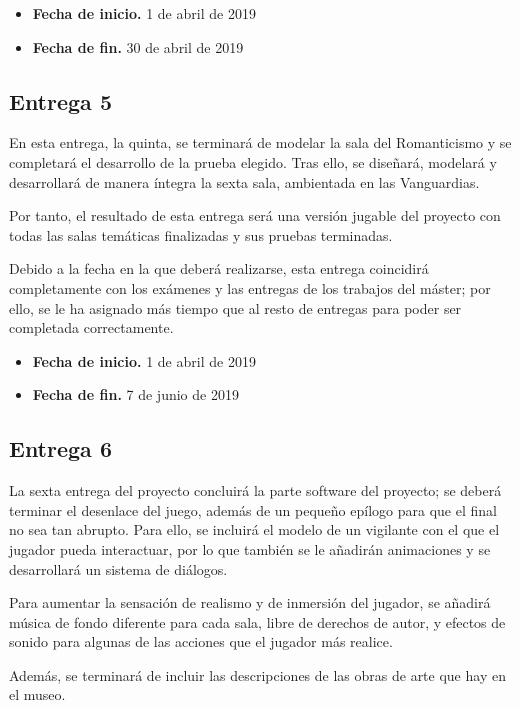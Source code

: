 \begin{itemize}
    \item \textbf{Fecha de inicio.} 1 de abril de 2019
    \item \textbf{Fecha de fin.} 30 de abril de 2019
\end{itemize}

\subsection{Entrega 5}

En esta entrega, la quinta, se terminará de modelar la sala del Romanticismo y se completará el desarrollo de la prueba elegido. Tras ello, se diseñará, modelará y desarrollará de manera íntegra la sexta sala, ambientada en las Vanguardias.

Por tanto, el resultado de esta entrega será una versión jugable del proyecto con todas las salas temáticas finalizadas y sus pruebas terminadas.

Debido a la fecha en la que deberá realizarse, esta entrega coincidirá completamente con los exámenes y las entregas de los trabajos del máster; por ello, se le ha asignado más tiempo que al resto de entregas para poder ser completada correctamente.

\begin{itemize}
    \item \textbf{Fecha de inicio.} 1 de abril de 2019
    \item \textbf{Fecha de fin.} 7 de junio de 2019
\end{itemize}


\subsection{Entrega 6}

La sexta entrega del proyecto concluirá la parte software del proyecto; se deberá terminar el desenlace del juego, además de un pequeño epílogo para que el final no sea tan abrupto. Para ello, se incluirá el modelo de un vigilante con el que el jugador pueda interactuar, por lo que también se le añadirán animaciones y se desarrollará un sistema de diálogos. 

Para aumentar la sensación de realismo y de inmersión del jugador, se añadirá música de fondo diferente para cada sala, libre de derechos de autor, y efectos de sonido para algunas de las acciones que el jugador más realice. 

Además, se terminará de incluir las descripciones de las obras de arte que hay en el museo.

